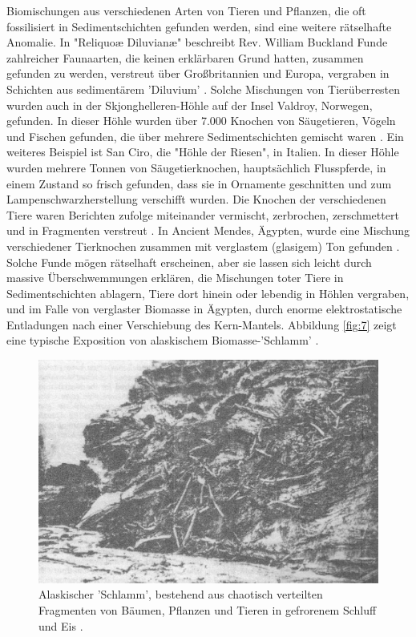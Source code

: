 \documentclass[10pt,twocolumn,letterpaper]{article}
\begin{document}
Biomischungen aus verschiedenen Arten von Tieren und Pflanzen, die oft fossilisiert in Sedimentschichten gefunden werden, sind eine weitere rätselhafte Anomalie. In "Reliquoæ Diluvianæ" beschreibt Rev. William Buckland Funde zahlreicher Faunaarten, die keinen erklärbaren Grund hatten, zusammen gefunden zu werden, verstreut über Großbritannien und Europa, vergraben in Schichten aus sedimentärem 'Diluvium' \cite{58}. Solche Mischungen von Tierüberresten wurden auch in der Skjonghelleren-Höhle auf der Insel Valdroy, Norwegen, gefunden. In dieser Höhle wurden über 7.000 Knochen von Säugetieren, Vögeln und Fischen gefunden, die über mehrere Sedimentschichten gemischt waren \cite{59}. Ein weiteres Beispiel ist San Ciro, die "Höhle der Riesen", in Italien. In dieser Höhle wurden mehrere Tonnen von Säugetierknochen, hauptsächlich Flusspferde, in einem Zustand so frisch gefunden, dass sie in Ornamente geschnitten und zum Lampenschwarzherstellung verschifft wurden. Die Knochen der verschiedenen Tiere waren Berichten zufolge miteinander vermischt, zerbrochen, zerschmettert und in Fragmenten verstreut \cite{60,61}. In Ancient Mendes, Ägypten, wurde eine Mischung verschiedener Tierknochen zusammen mit verglastem (glasigem) Ton gefunden \cite{57}. Solche Funde mögen rätselhaft erscheinen, aber sie lassen sich leicht durch massive Überschwemmungen erklären, die Mischungen toter Tiere in Sedimentschichten ablagern, Tiere dort hinein oder lebendig in Höhlen vergraben, und im Falle von verglaster Biomasse in Ägypten, durch enorme elektrostatische Entladungen nach einer Verschiebung des Kern-Mantels. Abbildung \ref{fig:7} zeigt eine typische Exposition von alaskischem Biomasse-'Schlamm' \cite{56}.

\begin{figure}[b]
\begin{center}
   \includegraphics[width=1\linewidth]{muck-crop.jpeg}
\end{center}
   \caption{Alaskischer 'Schlamm', bestehend aus chaotisch verteilten Fragmenten von Bäumen, Pflanzen und Tieren in gefrorenem Schluff und Eis \cite{146}.}
\label{fig:7}
\label{fig:onecol}
\end{figure}
\end{document}
